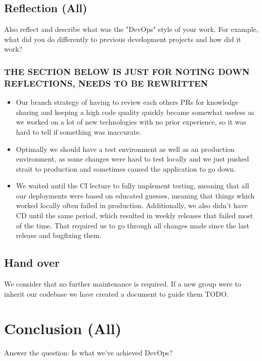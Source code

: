 \documentclass{article}
\begin{document}
\subsection{Reflection (All)}

Also reflect and describe what was the "DevOps" style of your work. For example, what did you do differently to previous development projects and how did it work?


\subsubsection{THE SECTION BELOW IS JUST FOR NOTING DOWN REFLECTIONS, NEEDS TO BE REWRITTEN}
\begin{itemize}
    \item Our branch strategy of having to review each others PRs for knowledge sharing and keeping a high code quality quickly became somewhat useless as we worked on a lot of new technologies with no prior experience, so it was hard to tell if something was inaccurate. 
    \item Optimally we should have a test environment as well as an production environment, as some changes were hard to test locally and we just pushed strait to production and sometimes caused the application to go down.
    \item We waited until the CI lecture to fully implement testing, meaning that all our deployments were based on educated guesses, meaning that things which worked locally often failed in production. Additionally, we also didn't have CD until the same period, which resulted in weekly releases that failed most of the time. That required us to go through all changes made since the last release and bugfixing them.
\end{itemize}
 

\subsection{Hand over}

We consider that no further maintenance is required. If a new group were to inherit our codebase we have created a document to guide them TODO. 

\section{Conclusion (All)}

Answer the question: Is what we've achieved DevOps?



\end{document}
